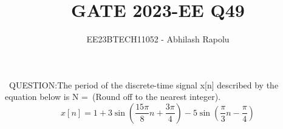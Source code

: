 \documentclass[journal,12pt,twocolumn]{IEEEtran}
\title{GATE 2023-EE Q49}
\author{EE23BTECH11052 - Abhilash Rapolu 
}
\begin{document}
\maketitle
\newpage
\bigskip
\ QUESTION:The period of the discrete-time signal x[n] described by the equation below is N =\ (Round off to the nearest integer).
$$x[n] = 1 + 3\sin\left(\frac{15\pi}{8}n + \frac{3\pi}{4}\right) - 5\sin\left(\frac{\pi}{3}n - \frac{\pi}{4}\right)$$
\end{document}
